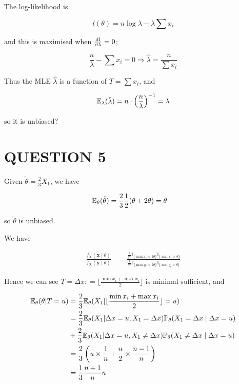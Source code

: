 \documentclass[a4paper]{article}
\begin{document}
\begin{enumerate}[label = (\alph*)]
	The log-likelihood is  
	
	\[ l(\theta) = n \log \lambda - \lambda \sum x_{i} \]
	
	and this is maximised when $ \frac{\mathrm{d} l}{\mathrm{d} \lambda} = 0 $;
	
	\[   \frac{n}{\lambda} - \sum x_{i} = 0 \Rightarrow \hat{\lambda} = \frac{n}{\sum x_{i}}  \]
	
	Thus the MLE $ \hat{\lambda} $ is a function of $ T = \sum x_{i} $, and 
	
	\[ \mathbb{E}_{\lambda}(\hat{\lambda}) = n \cdot \left( \frac{n}{\lambda} \right)^{-1} = \lambda  \]
	
	so it is unbiased?
	
	
	
	
	
\end{enumerate}

\section{QUESTION 5}

Given $ \tilde{\theta} = \frac{2}{3} X_{1} $, we have

\begin{align*}
\mathbb{E}_{\theta}(\tilde{\theta}) & = \frac{2}{3} \frac{1}{2}(\theta + 2 \theta)  = \theta
\end{align*}

so $ \tilde{\theta} $ is unbiased. 

We have

\begin{align*}
\frac{	f_{\mathbf{X}}(\mathbf{x} \; | \; \theta)}{	f_{\mathbf{X}}(\mathbf{y} \; | \; \theta)}& = \frac{ \frac{1}{\theta^{n}} \mathbb{I}_{\{ \max x_{i} < 2 \theta \}}  \mathbb{I}_{\{ \min x_{i} > \theta \}} }{ \frac{1}{\theta^{n}} \mathbb{I}_{\{ \max y_{i} < 2 \theta \}}  \mathbb{I}_{\{ \min y_{i} > \theta \}} }
\end{align*}

Hence we can see $ T = \Delta x : =  \lfloor  \frac{\min x_{i} + \max x_{i}}{2}  \rfloor  $ is minimal sufficient, and

\begin{align*}
\mathbb{E}_{\theta}(\tilde{\theta} | T = u) & = \frac{2}{3} \mathbb{E}_{\theta} ( X_{1} |  \lfloor  \frac{\min x_{i} + \max x_{i}}{2}  \rfloor  = u ) \\
& = \frac{2}{3} \mathbb{E}_{\theta} ( X_{1} |   \Delta x   = u, X_{1} =  \Delta x  ) \mathbb{P}_{\theta}( X_{1} = \Delta x  \; | \;  \Delta x  = u ) \\
& + \frac{2}{3} \mathbb{E}_{\theta} ( X_{1} |   \Delta x   = u, X_{1} \neq  \Delta x  ) \mathbb{P}_{\theta}( X_{1} \neq \Delta x  \; | \;  \Delta x  = u ) \\
& = \frac{2}{3} \left(  u \times \frac{1}{n} + \frac{u}{2} \times \frac{n-1}{n}  \right) \\
& = \frac{1}{3} \frac{n+1}{n} u 
\end{align*}
\end{document}
